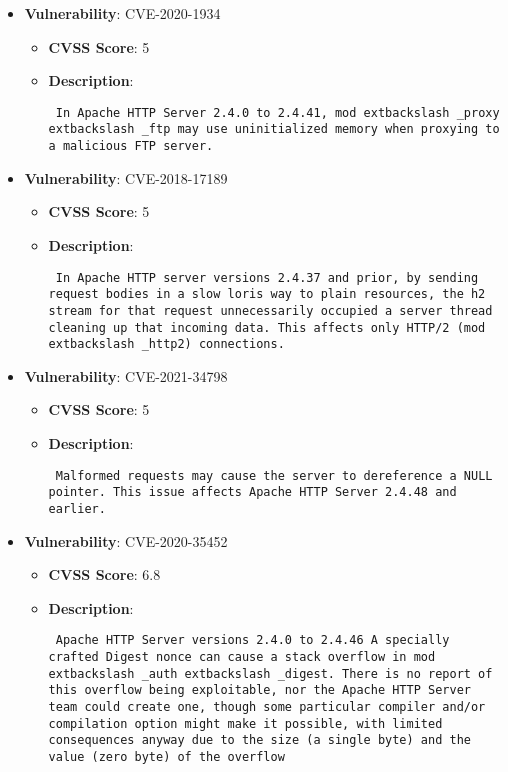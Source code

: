 \documentclass{article}
\begin{document}
\begin{itemize}
        \item \textbf{Vulnerability}: CVE-2020-1934
        \begin{itemize}
            \item \textbf{CVSS Score}:  5 
            \item \textbf{Description}: \parbox{\linewidth}{\texttt{ In Apache HTTP Server 2.4.0 to 2.4.41, mod	extbackslash _proxy	extbackslash _ftp may use uninitialized memory when proxying to a malicious FTP server. }}
        \end{itemize}
    
        \item \textbf{Vulnerability}: CVE-2018-17189
        \begin{itemize}
            \item \textbf{CVSS Score}:  5 
            \item \textbf{Description}: \parbox{\linewidth}{\texttt{ In Apache HTTP server versions 2.4.37 and prior, by sending request bodies in a slow loris way to plain resources, the h2 stream for that request unnecessarily occupied a server thread cleaning up that incoming data. This affects only HTTP/2 (mod	extbackslash _http2) connections. }}
        \end{itemize}
    
        \item \textbf{Vulnerability}: CVE-2021-34798
        \begin{itemize}
            \item \textbf{CVSS Score}:  5 
            \item \textbf{Description}: \parbox{\linewidth}{\texttt{ Malformed requests may cause the server to dereference a NULL pointer. This issue affects Apache HTTP Server 2.4.48 and earlier. }}
        \end{itemize}
    
        \item \textbf{Vulnerability}: CVE-2020-35452
        \begin{itemize}
            \item \textbf{CVSS Score}:  6.8 
            \item \textbf{Description}: \parbox{\linewidth}{\texttt{ Apache HTTP Server versions 2.4.0 to 2.4.46 A specially crafted Digest nonce can cause a stack overflow in mod	extbackslash _auth	extbackslash _digest. There is no report of this overflow being exploitable, nor the Apache HTTP Server team could create one, though some particular compiler and/or compilation option might make it possible, with limited consequences anyway due to the size (a single byte) and the value (zero byte) of the overflow }}
        \end{itemize}
    

\end{itemize}
\end{document}
